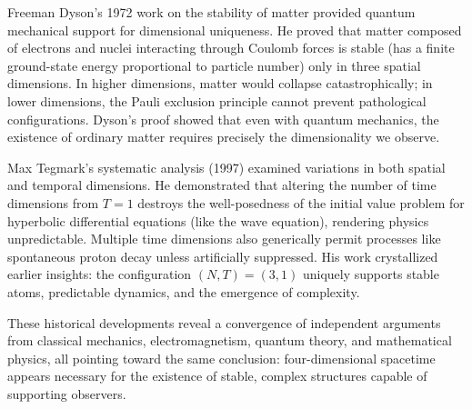 \begin{historical}
    Freeman Dyson's 1972 work on the stability of matter provided quantum mechanical support for dimensional uniqueness. He proved that matter composed of electrons and nuclei interacting through Coulomb forces is stable (has a finite ground-state energy proportional to particle number) only in three spatial dimensions. In higher dimensions, matter would collapse catastrophically; in lower dimensions, the Pauli exclusion principle cannot prevent pathological configurations. Dyson's proof showed that even with quantum mechanics, the existence of ordinary matter requires precisely the dimensionality we observe.
    
    Max Tegmark's systematic analysis (1997) examined variations in both spatial and temporal dimensions. He demonstrated that altering the number of time dimensions from $T = 1$ destroys the well-posedness of the initial value problem for hyperbolic differential equations (like the wave equation), rendering physics unpredictable. Multiple time dimensions also generically permit processes like spontaneous proton decay unless artificially suppressed. His work crystallized earlier insights: the configuration $(N,T) = (3,1)$ uniquely supports stable atoms, predictable dynamics, and the emergence of complexity.
    
    These historical developments reveal a convergence of independent arguments from classical mechanics, electromagnetism, quantum theory, and mathematical physics, all pointing toward the same conclusion: four-dimensional spacetime appears necessary for the existence of stable, complex structures capable of supporting observers.
    \end{historical}